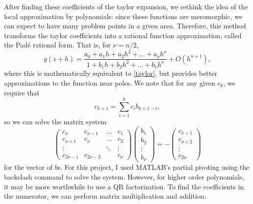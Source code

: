 \documentclass[12pt]{article}
\begin{document}
After finding these coefficients of the taylor expansion, we rethink the idea of the local approximation by polynomials: since these functions are meromorphic, we can expect to have many problem points in a given area. Therefore, this method transforms the taylor coefficients into a rational function approximation, called the Pad\'{e} rational form. That is, for $\nu = n/2$, 
\begin{equation} \label{pade}
 y(z+h) = \frac{ a_0 + a_1 h + a_2 h^2 + \dots + a_\nu h^\nu }{ 1 + b_1 h + b_2 h^2 + \dots + b_\nu h^\nu } + O(h^{n+1}),
\end{equation}
where this is mathematically equivalent to \eqref{taylor}, but provides better approximations to the function near poles. We note that for any given $c_k$, we require that 
$$ c_{k+1} = \sum_{i=1 }^k  c_{i} b_{k+1-i} ,$$ so we can solve the matrix system 
\begin{equation} \label{find_b}
 \left( \begin{array}{cccc} c_\nu & c_{\nu-1} & \dots & c_1 \\ c_{\nu+1} & c_\nu & \dots & c_2 \\ \vdots & & \ddots & \vdots \\ c_{2\nu - 1} & c_{2 \nu - 2} & & c_\nu \end{array} \right) \left( \begin{array}{c} b_1 \\ b_2 \\ \vdots \\ b_\nu \end{array} \right) = -\left( \begin{array}{c} c_{\nu+1} \\ c_{\nu +2} \\ \vdots \\ c_{2 \nu} \end{array} \right)
\end{equation}
for the vector of $b$s. For this project, I used MATLAB's partial pivoting using the backslash command to solve the system. However, for higher order polynomials, it may be more worthwhile to use a QR factorization. To find the coefficients in the numerator, we can perform matrix multiplication and addition: 
\end{document}
